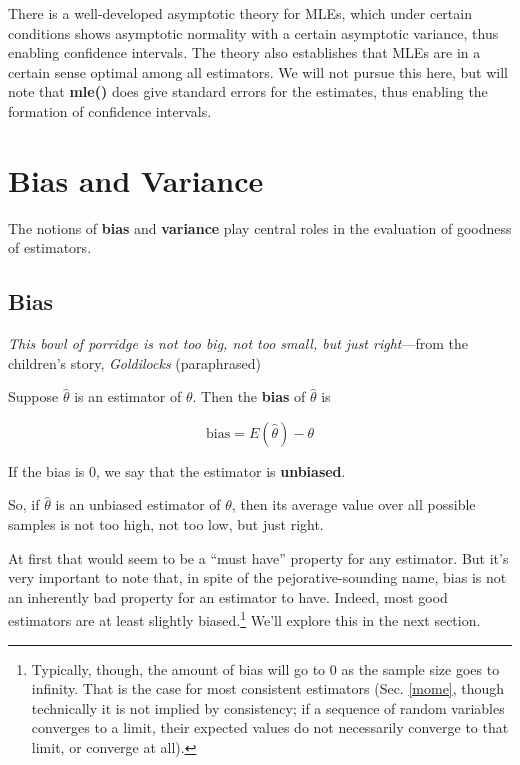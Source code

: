 There is a well-developed asymptotic theory for MLEs, which under
certain conditions shows asymptotic normality with a certain asymptotic
variance, thus enabling confidence intervals.  The theory also
establishes that MLEs are in a certain sense optimal among all
estimators.  We will not pursue this here, but will note that {\bf mle()}
does give standard errors for the estimates, thus enabling the
formation of confidence intervals.

\section{Bias and Variance}
\label{bv}

The notions of {\bf bias} and {\bf variance} play central roles in the
evaluation of goodness of estimators.

\subsection{Bias}

{\it This bowl of porridge is not too big, not too small, but just
right}---from the children's story, {\it Goldilocks} (paraphrased)

\begin{definition}
Suppose $\hat{\theta}$ is an estimator of $\theta$.
Then the {\bf bias} of $\hat{\theta}$ is 

\begin{equation}
\textrm{bias} = E(\hat{\theta}) - \theta
\end{equation}

If the bias is 0, we say that the estimator is {\bf unbiased}.
\end{definition}

So, if $\hat{\theta}$ is an unbiased estimator of $\theta$, then its
average value over all possible samples is not too high, not too low,
but just right.

At first that would seem to be a ``must have'' property for any
estimator.  But it's very important to note that, in spite of the
pejorative-sounding name, bias is not an inherently bad property for an
estimator to have.  Indeed, most good estimators are at least slightly
biased.\footnote{Typically, though, the amount of bias will go to 0 as
the sample size goes to infinity.  That is the case for most consistent
estimators (Sec. \ref{mome}, though technically it is not implied by
consistency; if a sequence of random variables converges to a limit,
their expected values do not necessarily converge to that limit, or
converge at all).} We'll explore this in the next section.

